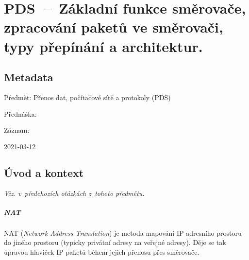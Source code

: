 

\graphicspath{{pds/smerovace/figures}}


\chapter{PDS~--~Základní funkce směrovače, zpracování paketů ve směrovači, typy přepínání a architektur.}


\section{Metadata}

\begin{compactitem}
    \item Předmět: Přenos dat, počítačové sítě a protokoly (PDS)
    \item Přednáška:
    \begin{compactitem}
        \item {}
    \end{compactitem}
    \item Záznam:
    \begin{compactitem}
        \item 2021-03-12
    \end{compactitem}
\end{compactitem}


\section{Úvod a kontext}


\textit{Viz.  v~předchozích otázkách z~tohoto předmětu.}

\paragraph*{NAT} NAT (\textit{Network Address Translation}) je metoda mapování IP adresního prostoru do jiného prostoru (typicky privátní adresy na veřejné adresy). Děje se tak úpravou hlaviček IP paketů během jejich přenosu přes směrovače.

